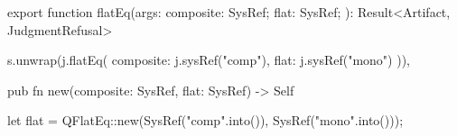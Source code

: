 \begin{tssrc}
export function flatEq(args: {
  composite: SysRef;
  flat: SysRef;
}): Result<Artifact, JudgmentRefusal>
\end{tssrc}
\begin{tssrc}
s.unwrap(j.flatEq({ composite: j.sysRef("comp"), flat: j.sysRef("mono") })),
\end{tssrc}
\begin{rustsrc}
pub fn new(composite: SysRef, flat: SysRef) -> Self
\end{rustsrc}
\begin{rustsrc}
let flat = QFlatEq::new(SysRef("comp".into()), SysRef("mono".into()));
\end{rustsrc}
